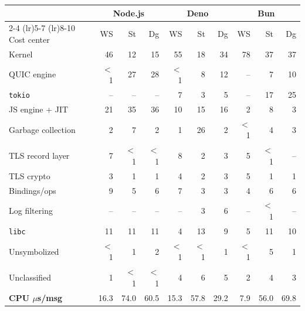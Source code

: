 \begin{tabular}{@{}l rrr rrr rrr@{}}
  \toprule
  & \multicolumn{3}{c}{Node.js} & \multicolumn{3}{c}{Deno} & \multicolumn{3}{c}{Bun} \\
  \cmidrule(lr){2-4} \cmidrule(lr){5-7} \cmidrule(lr){8-10}
  Cost center & WS & St & Dg & WS & St & Dg & WS & St & Dg \\
  \midrule
  Kernel & 46 & 12 & 15 & 55 & 18 & 34 & 78 & 37 & 37 \\
  QUIC engine & $<$1 & 27 & 28 & $<$1 & 8 & 12 & -- & 7 & 10 \\
  \texttt{tokio} & -- & -- & -- & 7 & 3 & 5 & -- & 17 & 25 \\
  JS engine + JIT & 21 & 35 & 36 & 10 & 15 & 16 & 2 & 8 & 3 \\
  Garbage collection & 2 & 7 & 2 & 1 & 26 & 2 & $<$1 & 4 & 3 \\
  TLS record layer & 7 & $<$1 & $<$1 & 8 & 2 & 3 & 5 & $<$1 & -- \\
  TLS crypto & 3 & 1 & 1 & 4 & 2 & 3 & 5 & 1 & 1 \\
  Bindings/ops & 9 & 5 & 6 & 7 & 3 & 3 & 4 & 6 & 6 \\
  Log filtering & -- & -- & -- & -- & 3 & 6 & -- & $<$1 & -- \\
  \texttt{libc} & 11 & 11 & 11 & 4 & 13 & 9 & 5 & 11 & 10 \\
  Unsymbolized & $<$1 & 1 & 2 & $<$1 & $<$1 & 1 & $<$1 & 5 & 1 \\
  Unclassified & 1 & $<$1 & $<$1 & 4 & 6 & 5 & 2 & 4 & 3 \\
  \midrule
  \textbf{CPU $\mu$s/msg} & 16.3 & 74.0 & 60.5 & 15.3 & 57.8 & 29.2 & 7.9 & 56.0 & 69.8 \\
  \bottomrule
\end{tabular}
